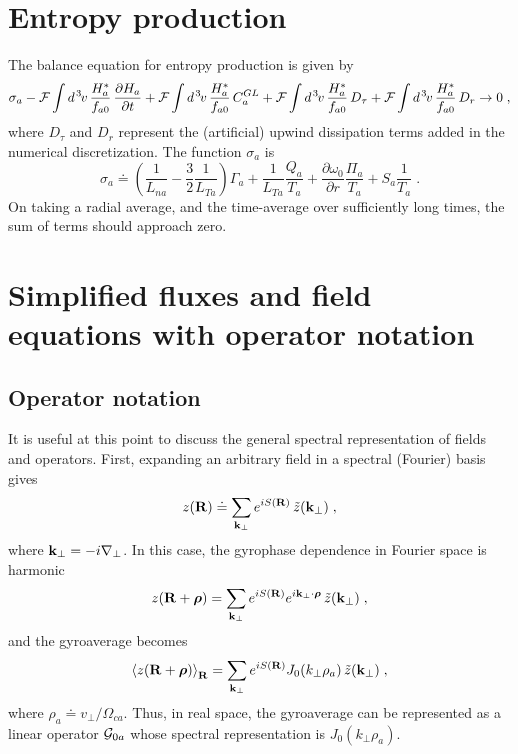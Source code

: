 \section{Entropy production}

The balance equation for entropy production is given by
%
\begin{equation}
\sigma_a 
- {\cal F} \int d^{\hskip 1pt 3} \hskip -1pt v \, \frac{H_a^*}{f_{a0}} \, \frac{\partial H_a}{\partial t}  
+ {\cal F} \int d^{\hskip 1pt 3} \hskip -1pt v \, \frac{H_a^*}{f_{a0}} \, C_a^{GL} 
+ {\cal F} \int d^{\hskip 1pt 3} \hskip -1pt v \, \frac{H_a^*}{f_{a0}} \, D_\tau  
+ {\cal F} \int d^{\hskip 1pt 3} \hskip -1pt v \, \frac{H_a^*}{f_{a0}} \, D_r \rightarrow 0 \; ,
\end{equation}
%
where $D_\tau$ and $D_r$ represent the (artificial) upwind dissipation 
terms added in the numerical discretization.  The function $\sigma_a$ 
is
%
\begin{equation}
\sigma_a \doteq
 \left( \frac{1}{L_{na}} - \frac{3}{2} \frac{1}{L_{Ta}} \right) \Gamma_a
+ \frac{1}{L_{Ta}} \frac{Q_a}{T_a} 
+ \frac{\partial\omega_0}{\partial r} \frac{\Pi_a}{T_a}  
+ S_a \frac{1}{T_a} \; .
\end{equation} 
%
On taking a radial average, and the time-average over sufficiently 
long times, the sum of terms should approach zero.

\section{Simplified fluxes and field equations with operator notation}

\subsection{Operator notation}\label{sec.opnotation}

It is useful at this point to discuss the general spectral 
representation of fields and operators.  First, expanding an 
arbitrary field in a spectral (Fourier) basis gives
%
\begin{equation}
z(\mathbf{R}) \doteq \sum_{\mathbf{k}_\perp} e^{iS(\mathbf{R})} \, \tilde{z}(\mathbf{k}_\perp) \; ,
\end{equation}
%
where $\mathbf{k}_\perp = -i\nabla_\perp$.  In this case, the gyrophase dependence 
in Fourier space is harmonic
%
\begin{equation}
z(\mathbf{R}+\boldsymbol{\rho}) = \sum_{\mathbf{k}_\perp} e^{iS(\mathbf{R})} e^{i \mathbf{k}_\perp \cdot \boldsymbol{\rho}} 
  \, \tilde{z}(\mathbf{k}_\perp) \; ,
\end{equation}
% 
and the gyroaverage becomes
%
\begin{equation}
\left< z(\mathbf{R}+\boldsymbol{\rho}) \right>_{\mathbf{R}} = \sum_{\mathbf{k}_\perp} e^{iS(\mathbf{R})} J_0 (k_\perp\rho_a) \, \tilde{z}(\mathbf{k}_\perp) \; ,
\end{equation}
%
where $\rho_a \doteq v_\perp/\Omega_{ca}$.  Thus, in real space, the 
gyroaverage can be represented as a linear operator ${\cal G}_{0a}$ whose 
spectral representation is $J_0(k_\perp \rho_a)$.

